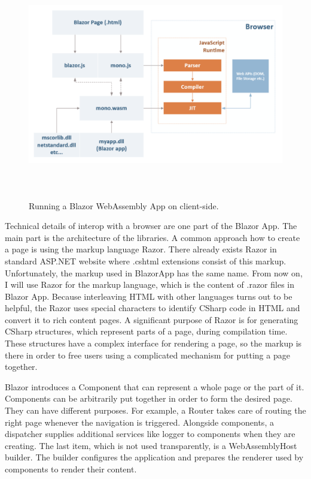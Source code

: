 \begin{figure}[H]\centering
\includegraphics[width=140mm, height=100mm]{./img/BlazorExecution}
\caption{Running a Blazor WebAssembly App on client-side.}
\label{img01:wasm}
\end{figure}

Technical details of interop with a browser are one part of the Blazor App.
The main part is the architecture of the libraries.
A common approach how to create a page is using the markup language Razor.
There already exists Razor in standard ASP.NET website where .cshtml extensions consist of this markup.
Unfortunately, the markup used in BlazorApp has the same name.
From now on, I will use Razor for the markup language, which is the content of .razor files in Blazor App.
Because interleaving HTML with other languages turns out to be helpful, the Razor uses special characters to identify CSharp code in HTML and convert it to rich content pages.
A significant purpose of Razor is for generating CSharp structures, which represent parts of a page, during compilation time.
These structures have a complex interface for rendering a page, so the markup is there in order to free users using a complicated mechanism for putting a page together.

Blazor introduces a Component that can represent a whole page or the part of it.
Components can be arbitrarily put together in order to form the desired page.
They can have different purposes. For example, a Router takes care of routing the right page whenever the navigation is triggered.
Alongside components, a dispatcher supplies additional services like logger to components when they are creating.
The last item, which is not used transparently, is a WebAssemblyHost builder.
The builder configures the application and prepares the renderer used by components to render their content.

